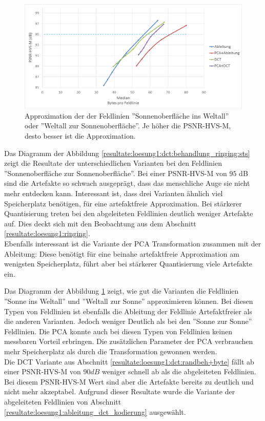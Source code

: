 \begin{figure}[!htbp]
	\center
\includegraphics[width=1\textwidth,keepaspectratio]{./pictures/resultate/loesung1/ringing/nosts.png}
	\caption{Approximation der der Feldlinien ''Sonnenoberfläche ins Weltall'' oder ''Weltall zur Sonnenoberfläche''. Je höher die PSNR-HVS-M, desto besser ist die Approximation.}	\label{resultate:loesung1:dct:behandlung_ringing:nosts}
\end{figure}
Das Diagramm der Abbildung \ref{resultate:loesung1:dct:behandlung_ringing:sts} zeigt die Resultate der unterschiedlichen Varianten bei den Feldlinien ''Sonnenoberfläche zur Sonnenoberfläche''. Bei einer PSNR-HVS-M von $95$ dB sind die Artefakte so schwach ausgeprägt, dass das menschliche Auge sie nicht mehr entdecken kann. Interessant ist, dass drei Varianten ähnlich viel Speicherplatz benötigen, für eine artefaktfreie Approximation. Bei stärkerer Quantisierung treten bei den abgeleiteten Feldlinien deutlich weniger Artefakte auf. Dies deckt sich mit den Beobachtung aus dem Abschnitt \ref{resultate:loesung1:ringing}.\\
Ebenfalls interessant ist die Variante der PCA Transformation zusammen mit der Ableitung: Diese benötigt für eine beinahe artefaktfreie Approximation am wenigsten Speicherplatz, führt aber bei stärkerer Quantisierung viele Artefakte ein.

Das Diagramm der Abbildung  \ref{resultate:loesung1:dct:behandlung_ringing:nosts} zeigt, wie gut die Varianten die Feldlinien ''Sonne ins Weltall'' und ''Weltall zur Sonne'' approximieren können. Bei diesen Typen von Feldlinien ist ebenfalls die Ableitung der Feldlinie Artefaktfreier als die anderen Varianten. Jedoch weniger Deutlich als bei den ''Sonne zur Sonne'' Feldlinien. Die PCA konnte auch bei diesen Typen von Feldlinien keinen messbaren Vorteil erbringen. Die zusätzlichen Parameter der PCA verbrauchen mehr Speicherplatz als durch die Transformation gewonnen werden.\\
Die DCT Variante aus Abschnitt \ref{resultate:loesung1:dct:randbeh+byte} fällt ab einer PSNR-HVS-M von $90 dB$ weniger schnell ab als die abgeleiteten Feldlinien. Bei diesem PSNR-HVS-M Wert sind aber die Artefakte bereits zu deutlich und nicht mehr akzeptabel. Aufgrund dieser Resultate wurde die Variante der abgeleiteten Feldlinien von Abschnitt \ref{resultate:loesung1:ableitung_dct_kodierung} ausgewählt. 

